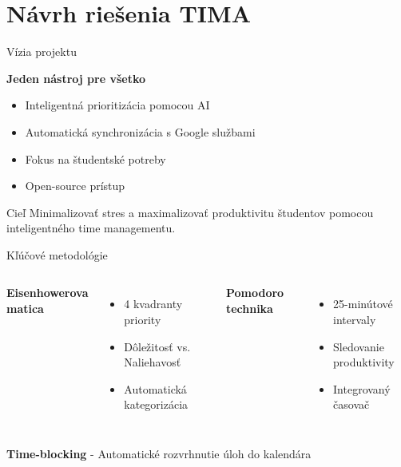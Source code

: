 \documentclass{beamer}
\begin{document}
\section{Návrh riešenia TIMA}

\begin{frame}{Vízia projektu}
\begin{center}
\Large
\textbf{Jeden nástroj pre všetko}
\end{center}

\begin{itemize}
\item Inteligentná prioritizácia pomocou AI
\item Automatická synchronizácia s Google službami
\item Fokus na študentské potreby
\item Open-source prístup
\end{itemize}

\vspace{0.5cm}
\begin{block}{Cieľ}
Minimalizovať stres a maximalizovať produktivitu študentov pomocou inteligentného time managementu.
\end{block}
\end{frame}

\begin{frame}{Kľúčové metodológie}
\begin{columns}
\textbf{Eisenhowerova matica}
\begin{itemize}
\item 4 kvadranty priority
\item Dôležitosť vs. Naliehavosť
\item Automatická kategorizácia
\end{itemize}

\textbf{Pomodoro technika}
\begin{itemize}
\item 25-minútové intervaly
\item Sledovanie produktivity
\item Integrovaný časovač
\end{itemize}
\end{columns}

\vspace{0.5cm}
\begin{center}
\textbf{Time-blocking} - Automatické rozvrhnutie úloh do kalendára
\end{center}
\end{frame}
\end{document}
